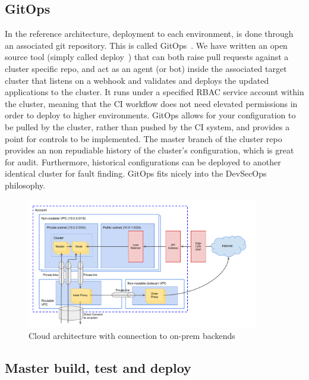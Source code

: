 \documentclass[reprint,amsmath,amssymb,aps]{revtex4-1}
\begin{document}
\subsection{\label{sec:gitops}GitOps}

In the reference architecture, deployment to each environment, is done through an associated git repository. This is called GitOps~\cite{GitOpsPa62:online}. We have written an open source tool (simply called deploy~\cite{redbadge45:online}) that can both raise pull requests against a cluster specific repo, and act as an agent (or bot) inside the associated target cluster that listens on a webhook and validates and deploys the updated applications to the cluster. It runs under a specified RBAC service account within the cluster, meaning that the CI workflow does not need elevated permissions in order to deploy to higher environments. GitOps allows for your configuration to be pulled by the cluster, rather than pushed by the CI system, and provides a point for controls to be implemented. The master branch of the cluster repo provides an non repudiable history of the cluster’s configuration, which is great for audit. Furthermore, historical configurations can be deployed to another identical cluster for fault finding. GitOps fits nicely into the DevSecOps~\cite{devsecop73:online} philosophy.

\begin{figure}[t!]
	\includegraphics[width=0.9\textwidth]{figs/infrastructure}
	\caption{Cloud architecture with connection to on-prem backends}
	\label{fig:infrastructure}
\end{figure}

\subsection{\label{sec:masterbuild}Master build, test and deploy}
\end{document}
